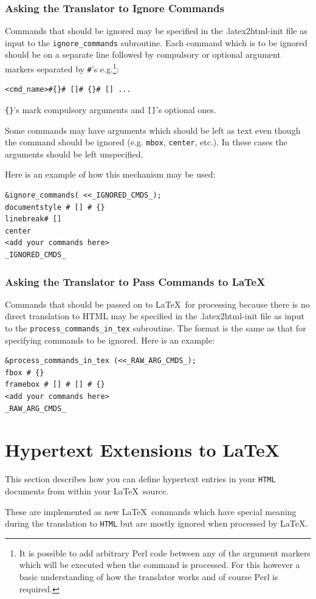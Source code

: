 \documentclass[dvips]{article}
\newcommand{\fn}[1]{{\ttfamily #1}}	%
\begin{document}
\subsubsection{Asking the Translator to Ignore Commands}
Commands that should be ignored may be specified in the 
\fn{.latex2html-init}
file as input to the \verb|ignore_commands| subroutine. 
Each command which is to be ignored should be on a separate line 
followed by compulsory or optional argument markers separated by 
{\verb|#|}'s e.g.\footnote{It is possible to add arbitrary Perl code
between any of the argument markers which will be executed when 
the command is processed. For this however a basic understanding of
how the translator works and of course Perl is required.}:
\begin{verbatim}
<cmd_name>#{}# []# {}# [] ...
\end{verbatim} 
\verb|{}|'s mark compulsory arguments and \verb|[]|'s optional ones.

Some commands may have arguments which should be left as text even
though the command should be ignored (e.g. \texttt{mbox},
\texttt{center}, etc.). In these cases the arguments should be left
unspecified.

Here is an example of how this mechanism may be used:
\begin{verbatim}
&ignore_commands( <<_IGNORED_CMDS_);
documentstyle # [] # {}
linebreak# []
center
<add your commands here>
_IGNORED_CMDS_
\end{verbatim}
\subsubsection{Asking the Translator to Pass Commands to \LaTeX}
\label{pass}
Commands that should be passed on to \LaTeX\  for processing because
there is no direct translation to HTML may be specified in the 
\fn{.latex2html-init}
file as input to the \verb|process_commands_in_tex|
subroutine.
The format is the same as that for specifying commands to be ignored.
Here is an example:
\begin{verbatim}
&process_commands_in_tex (<<_RAW_ARG_CMDS_);
fbox # {}
framebox # [] # [] # {}
<add your commands here>
_RAW_ARG_CMDS_
\end{verbatim}

\section{Hypertext Extensions to \LaTeX}
\label{special} 
\begin{changebar}
This section describes how you can define hypertext entries in
your \texttt{HTML} documents from within your \LaTeX\ source.
\end{changebar}
These are implemented as new \LaTeX\ commands which have special 
meaning during the translation to \texttt{HTML} but are mostly ignored when
processed by \LaTeX.
\end{document}
